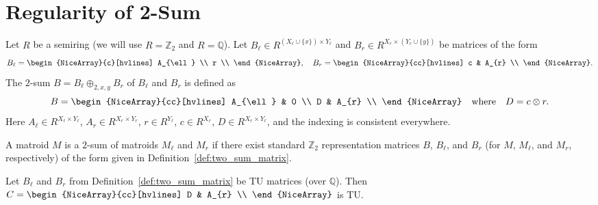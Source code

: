 \section{Regularity of 2-Sum}

\begin{definition}\label{def:two_sum_matrix}
    Let $R$ be a semiring (we will use $R = \mathbb{Z}_{2}$ and $R = \mathbb{Q}$). Let $B_{\ell} \in R^{(X_{\ell} \cup \{x\}) \times Y_{\ell}}$ and $B_{r} \in R^{X_{r} \times (Y_{r} \cup \{y\})}$ be matrices of the form
    \[
        B_{\ell} = \begin{NiceArray}{c}[hvlines] A_{\ell} \\ r \\ \end{NiceArray}, \quad
        B_{r} = \begin{NiceArray}{cc}[hvlines] c & A_{r} \\ \end{NiceArray}.
    \]
    The $2$-sum $B = B_{\ell} \oplus_{2, x, y} B_{r}$ of $B_{\ell}$ and $B_{r}$ is defined as
    \[
        B = \begin{NiceArray}{cc}[hvlines] A_{\ell} & 0 \\ D & A_{r} \\ \end{NiceArray}
        \quad \text{where} \quad
        D = c \otimes r.
    \]
    Here $A_{\ell} \in R^{X_{\ell} \times Y_{\ell}}$, $A_{r} \in R^{X_{r} \times Y_{r}}$, $r \in R^{Y_{\ell}}$, $c \in R^{X_{r}}$, $D \in R^{X_{r} \times Y_{\ell}}$, and the indexing is consistent everywhere.
\end{definition}

\begin{definition}\label{def:two_sum_matroid}
    A matroid $M$ is a $2$-sum of matroids $M_{\ell}$ and $M_{r}$ if there exist standard $\mathbb{Z}_{2}$ representation matrices $B$, $B_{\ell}$, and $B_{r}$ (for $M$, $M_{\ell}$, and $M_{r}$, respectively) of the form given in Definition~\ref{def:two_sum_matrix}.
\end{definition}

\begin{lemma}\label{lem:two_sum_bottom_tu}
    Let $B_{\ell}$ and $B_{r}$ from Definition~\ref{def:two_sum_matrix} be TU matrices (over $\mathbb{Q}$). Then $C = \begin{NiceArray}{cc}[hvlines] D & A_{r} \\ \end{NiceArray}$ is TU.
\end{lemma}

